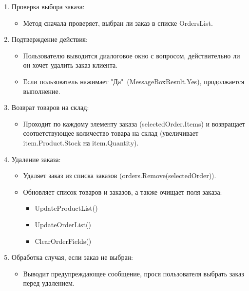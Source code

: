 \documentclass[12pt]{article}
\renewcommand{\texttt}[1]{{\small\ttfamily #1}}
\numberwithin{listing}{section}
\numberwithin{figure}{section}
\begin{document}
\begin{enumerate}
	\item Проверка выбора заказа:
	      \begin{itemize}
		      \item Метод сначала проверяет, выбран ли заказ в списке \texttt{OrdersList}.
	      \end{itemize}
	\item Подтверждение действия:
	      \begin{itemize}
		      \item Пользователю выводится диалоговое окно с вопросом, действительно ли он хочет удалить заказ клиента.
		      \item Если пользователь нажимает "Да"\ (\texttt{MessageBoxResult.Yes}), продолжается выполнение.
	      \end{itemize}
	\item Возврат товаров на склад:
	      \begin{itemize}
		      \item Проходит по каждому элементу заказа (\texttt{selectedOrder.Items}) и возвращает соответствующее количество товара на склад (увеличивает \texttt{item.Product.Stock} на \texttt{item.Quantity}).
	      \end{itemize}
	\item Удаление заказа:
	      \begin{itemize}
		      \item Удаляет заказ из списка заказов (\texttt{orders.Remove(selectedOrder)}).
		      \item Обновляет список товаров и заказов, а также очищает поля заказа:
		            \begin{itemize}
			            \item \texttt{UpdateProductList()}
			            \item \texttt{UpdateOrderList()}
			            \item \texttt{ClearOrderFields()}
		            \end{itemize}
	      \end{itemize}
	\item Обработка случая, если заказ не выбран:
	      \begin{itemize}
		      \item Выводит предупреждающее сообщение, прося пользователя выбрать заказ перед удалением.
	      \end{itemize}

\end{enumerate}
\end{document}
